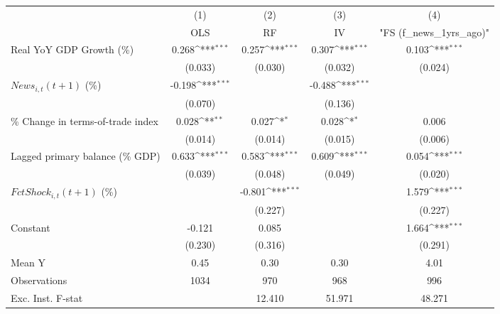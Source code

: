{
\def\sym#1{\ifmmode^{#1}\else\(^{#1}\)\fi}
\begin{tabular}{l*{4}{c}}
\toprule
                    &\multicolumn{1}{c}{(1)}&\multicolumn{1}{c}{(2)}&\multicolumn{1}{c}{(3)}&\multicolumn{1}{c}{(4)}\\
                    &\multicolumn{1}{c}{OLS}&\multicolumn{1}{c}{RF}&\multicolumn{1}{c}{IV}&\multicolumn{1}{c}{ "FS (f_news_1yrs_ago)" }\\
\midrule
Real YoY GDP Growth (\%)&       0.268\sym{***}&       0.257\sym{***}&       0.307\sym{***}&       0.103\sym{***}\\
                    &     (0.033)         &     (0.030)         &     (0.032)         &     (0.024)         \\
\addlinespace
$ News_{i,t}(t+1)$ (\%)&      -0.198\sym{***}&                     &      -0.488\sym{***}&                     \\
                    &     (0.070)         &                     &     (0.136)         &                     \\
\addlinespace
\% Change in terms-of-trade index&       0.028\sym{**} &       0.027\sym{*}  &       0.028\sym{*}  &       0.006         \\
                    &     (0.014)         &     (0.014)         &     (0.015)         &     (0.006)         \\
\addlinespace
Lagged primary balance (\% GDP)&       0.633\sym{***}&       0.583\sym{***}&       0.609\sym{***}&       0.054\sym{***}\\
                    &     (0.039)         &     (0.048)         &     (0.049)         &     (0.020)         \\
\addlinespace
$ FctShock_{i,t}(t+1)$ (\%)&                     &      -0.801\sym{***}&                     &       1.579\sym{***}\\
                    &                     &     (0.227)         &                     &     (0.227)         \\
\addlinespace
Constant            &      -0.121         &       0.085         &                     &       1.664\sym{***}\\
                    &     (0.230)         &     (0.316)         &                     &     (0.291)         \\
\midrule
Mean Y              &        0.45         &        0.30         &        0.30         &        4.01         \\
Observations        &        1034         &         970         &         968         &         996         \\
Exc. Inst. F-stat   &                     &      12.410         &      51.971         &      48.271         \\
\bottomrule
\end{tabular}
}
